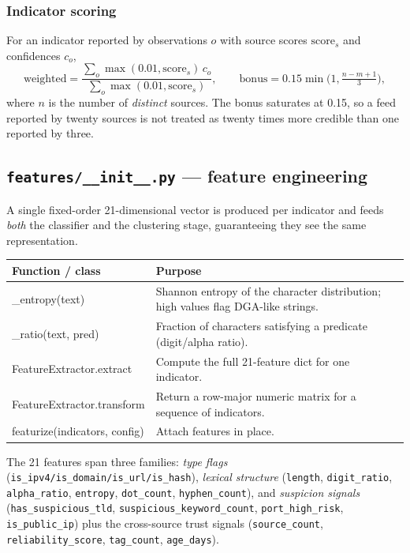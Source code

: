 \documentclass[11pt,a4paper]{article}
\newcommand{\code}[1]{\texttt{\small #1}}
\begin{document}
\subsubsection{Indicator scoring}
For an indicator reported by observations $o$ with source scores
$\mathrm{score}_s$ and confidences $c_o$,
\[
\text{weighted} = \frac{\sum_o \max(0.01,\mathrm{score}_s)\, c_o}{\sum_o \max(0.01,\mathrm{score}_s)},
\qquad
\text{bonus} = 0.15\min\!\Big(1,\tfrac{n-m+1}{3}\Big),
\]
where $n$ is the number of \emph{distinct} sources. The bonus saturates at 0.15,
so a feed reported by twenty sources is not treated as twenty times more
credible than one reported by three.

\subsection{\code{features/\_\_init\_\_.py} --- feature engineering}
A single fixed-order 21-dimensional vector is produced per indicator and feeds
\emph{both} the classifier and the clustering stage, guaranteeing they see the
same representation.

\begin{center}
\begin{tabularx}{\linewidth}{@{}>{\ttfamily\small}p{4.6cm}X@{}}
\toprule
\rowcolor{paper}\textbf{Function / class} & \textbf{Purpose} \\
\midrule
\_entropy(text) & Shannon entropy of the character distribution; high values flag DGA-like strings. \\
\_ratio(text, pred) & Fraction of characters satisfying a predicate (digit/alpha ratio). \\
FeatureExtractor.extract & Compute the full 21-feature dict for one indicator. \\
FeatureExtractor.transform & Return a row-major numeric matrix for a sequence of indicators. \\
featurize(indicators, config) & Attach features in place. \\
\bottomrule
\end{tabularx}
\end{center}

The 21 features span three families: \emph{type flags}
(\code{is\_ipv4/is\_domain/is\_url/is\_hash}), \emph{lexical structure}
(\code{length}, \code{digit\_ratio}, \code{alpha\_ratio}, \code{entropy},
\code{dot\_count}, \code{hyphen\_count}), and \emph{suspicion signals}
(\code{has\_suspicious\_tld}, \code{suspicious\_keyword\_count},
\code{port\_high\_risk}, \code{is\_public\_ip}) plus the cross-source trust
signals (\code{source\_count}, \code{reliability\_score}, \code{tag\_count},
\code{age\_days}).
\end{document}
